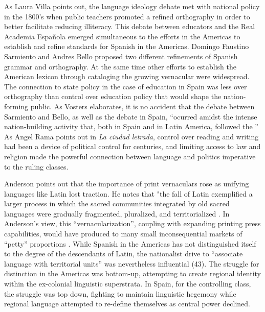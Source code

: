 \documentclass[12pt]{report}
\begin{document}
As Laura Villa points out, the language ideology debate met with national policy in the 1800's when public teachers promoted a refined orthography in order to better facilitate reducing illiteracy\nocite{Villa2015a}.
This debate between educators and the Real Academia Española emerged simultaneous to the efforts in the Americas to establish and refine standards for Spanish in the Americas.
Domingo Faustino Sarmiento and Andres Bello proposed two different refinements of Spanish grammar and orthography.
At the same time other efforts to establish the American lexicon through cataloging the growing vernacular were widespread. 
The connection to state policy in the case of education in Spain was less over orthography than control over education policy that would shape the nation-forming public.
As Vosters elaborates, it is no accident that the debate between Sarmiento and Bello, as well as the debate in Spain, \enquote{ocurred amidst the intense nation-building activity that, both in Spain and in Latin America, followed the }
As Angel Rama points out in \textit{La ciudad letrada}, control over reading and writing had been a device of political control for centuries, and limiting access to law and religion made the powerful connection between language and politics imperative to the ruling classes.


Anderson points out that the importance of print vernaculars rose as unifying languages like Latin lost traction.
He notes that "the fall of Latin exemplified a larger process in which the sacred communities integrated by old sacred languages were gradually fragmented, pluralized, and territorialized \cite[19]{Anderson2006}. 
In Anderson's view, this \enquote{vernacularization}, coupling with expanding printing press capabilities, would have produced to many small inconsequential markets of \enquote{petty} proportions \cite[43]{Anderson2006}.
While Spanish in the Americas has not distinguished itself to the degree of the descendants of Latin, the nationalist drive to \enquote{associate language with territorial units} was nevertheless influential (43).
The struggle for distinction in the Americas was bottom-up, attempting to create regional identity within the ex-colonial linguistic superstrata.
In Spain, for the controlling class, the struggle was top down, fighting to maintain linguistic hegemony while regional language attempted to re-define themselves as central power declined.
\end{document}
